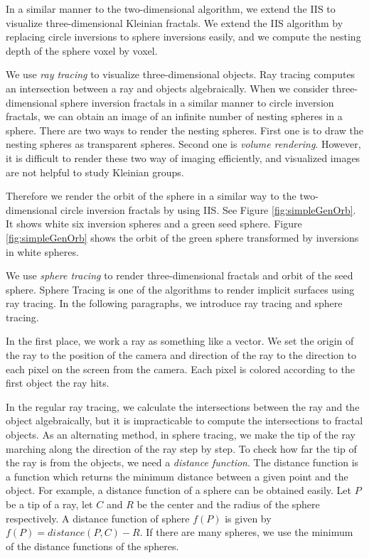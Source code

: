 In a similar manner to the two-dimensional algorithm,
we extend the IIS to visualize three-dimensional Kleinian fractals.
We extend the IIS algorithm by replacing circle inversions to sphere inversions easily, 
and we compute the nesting depth of the sphere voxel by voxel.

We use \textit{ray tracing} to visualize three-dimensional objects.
Ray tracing computes an intersection between a ray and objects
algebraically.
When we consider three-dimensional sphere inversion fractals in a similar
manner to circle inversion fractals, we can obtain an image of an
infinite number of nesting spheres in a sphere.
There are two ways to render the nesting spheres. First one is to draw
the nesting spheres as transparent spheres.
Second one is \textit{volume rendering}.
However, it is difficult to render these two way of imaging efficiently, and
visualized images are not helpful to study Kleinian groups.

Therefore we render the orbit of the sphere in a similar way to the
two-dimensional circle inversion fractals by using IIS.
See Figure \ref{fig:simpleGenOrb}. It shows
white six inversion spheres and a green seed sphere.
Figure \ref{fig:simpleGenOrb} shows the orbit of
the green sphere transformed by inversions in white spheres.

We use \textit{sphere tracing} \cite{hart1996sphere} to render three-dimensional
fractals and orbit of the seed sphere.
Sphere Tracing is one of the algorithms to render implicit surfaces using
ray tracing.
In the following paragraphs, we introduce ray tracing and
sphere tracing.

In the first place, we work a ray as something like a vector.
We set the origin of the ray to the position of the camera
and direction of the ray to the direction to each pixel on the screen
from the camera. Each pixel is colored according to the
first object the ray hits. 

In the regular ray tracing, we calculate the intersections between the
ray and the object algebraically, but
it is impracticable to compute the intersections to fractal objects.
As an alternating method, in sphere tracing, we make the tip of the
ray marching along the direction of the ray step by step. 
To check how far the tip of the ray is from the objects, we need a
\textit{distance function}.
The distance function is a function which returns the minimum distance
between a given point and the object.
For example, a distance function of a sphere can be obtained easily.
Let $P$ be a tip of a ray, let $C$ and $R$ be the center and the radius
of the sphere respectively.
A distance function of sphere $f(P)$ is given by $f(P) = distance(P, C) - R$.
If there are many spheres, we use the minimum of the distance functions
of the spheres.

